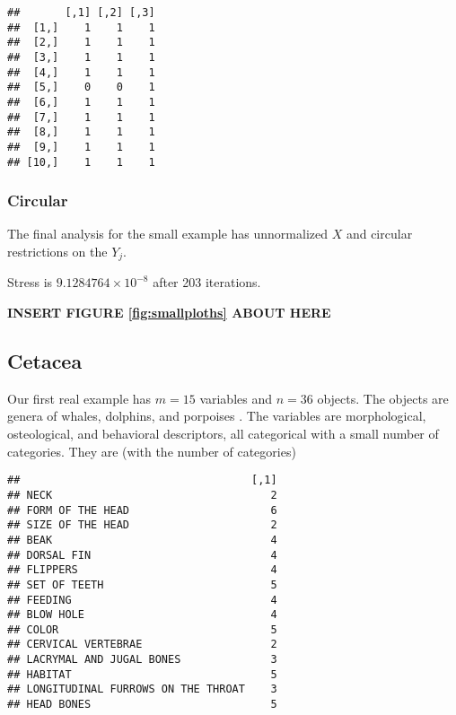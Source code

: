 \documentclass[
  12pt,
]{article}
\begin{document}
\begin{verbatim}
##       [,1] [,2] [,3]
##  [1,]    1    1    1
##  [2,]    1    1    1
##  [3,]    1    1    1
##  [4,]    1    1    1
##  [5,]    0    0    1
##  [6,]    1    1    1
##  [7,]    1    1    1
##  [8,]    1    1    1
##  [9,]    1    1    1
## [10,]    1    1    1
\end{verbatim}

\subsubsection{Circular}\label{circular}

The final analysis for the small example has unnormalized \(X\) and circular restrictions on the \(Y_j\).

Stress is \ensuremath{9.1284764\times 10^{-8}} after 203 iterations.

\begin{greybox}

\begin{center}
\textbf{INSERT FIGURE \ref{fig:smallploths} ABOUT HERE}

\end{center}

\end{greybox}

\subsection{Cetacea}\label{cetacea}

Our first real example has \(m=15\) variables and \(n=36\) objects. The
objects are genera of whales, dolphins, and porpoises . The variables are morphological, osteological, and behavioral descriptors,
all categorical with a small number of categories. They are (with the number of categories)

\begin{verbatim}
##                                    [,1]
## NECK                                  2
## FORM OF THE HEAD                      6
## SIZE OF THE HEAD                      2
## BEAK                                  4
## DORSAL FIN                            4
## FLIPPERS                              4
## SET OF TEETH                          5
## FEEDING                               4
## BLOW HOLE                             4
## COLOR                                 5
## CERVICAL VERTEBRAE                    2
## LACRYMAL AND JUGAL BONES              3
## HABITAT                               5
## LONGITUDINAL FURROWS ON THE THROAT    3
## HEAD BONES                            5
\end{verbatim}
\end{document}
